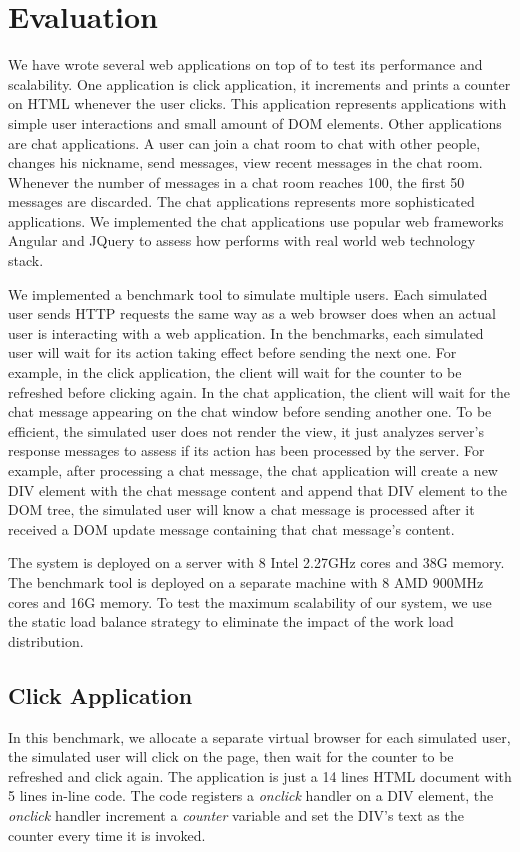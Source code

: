 \section{Evaluation}
\label{sec:eval}
We have wrote several web applications on top of \cb{} to test its
performance and scalability.
One application is click application,
it increments and prints a counter on HTML whenever the user clicks.
This application represents applications with simple user interactions and small amount of DOM elements.
Other applications are chat applications.
A user can join a chat room to chat with other people,
changes his nickname, send messages, view recent messages in the chat room.
Whenever the number of messages in a chat room reaches 100, the first 50 messages
are discarded.
The chat applications represents more sophisticated applications.
We implemented the chat applications use popular web frameworks Angular and JQuery
to assess how \cb{} performs with real world web technology stack.


\chatroomfig{}

We implemented a benchmark tool to simulate multiple users.
Each simulated user sends HTTP requests the same way as
a web browser does when an actual user is interacting with a web application.
In the benchmarks, each simulated user will wait for its action taking effect before
sending the next one.
For example, in the click application, the client will wait for the counter
to be refreshed before clicking again.
In the chat application, the client will wait for
the chat message appearing on the chat window before sending another one.
To be efficient, the simulated user does not render the view,
it just analyzes server's response messages to assess
if its action has been processed by the server.
For example, after processing a chat message,
the chat application will create a new DIV element with the chat message content
and append that DIV element to the DOM tree,
the simulated user will know a chat message is processed after it received
a DOM update message containing that chat message's content.

The \cb{} system is deployed on a server with 8 Intel 2.27GHz cores and 38G memory.
The benchmark tool is deployed on a separate machine with 8 AMD 900MHz cores and 16G memory.
To test the maximum scalability of our system, we use the static load balance strategy
to eliminate the impact of the work load distribution.

\subsection{Click Application}
In this benchmark,
we allocate a separate virtual browser for each simulated user,
the simulated user will click on the page,
then wait for the counter to be refreshed and click again.
The application is just a 14 lines HTML document with 5 lines in-line \js{} code.
The \js{} code registers a \emph{onclick} handler on a DIV element,
the \emph{onclick} handler increment a \emph{counter} variable and set the DIV's text as
the counter every time it is invoked.
\clickthroughput{}

